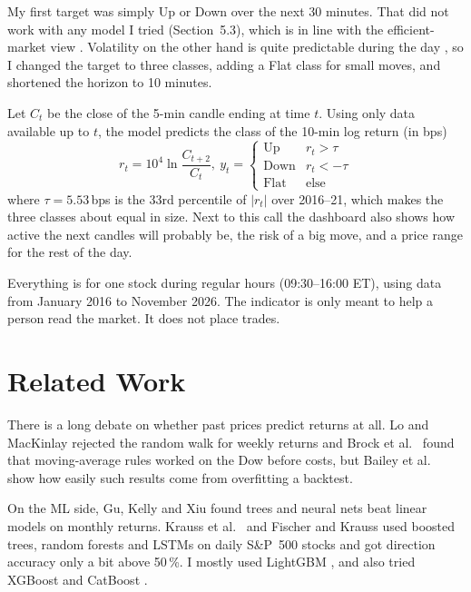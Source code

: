 \documentclass[11pt,a4paper]{article}
\begin{document}
My first target was simply Up or Down over the next 30 minutes. That did not work with any model I tried (Section~5.3),
which is in line with the efficient-market view \cite{fama1970}. Volatility on the other hand is quite predictable
during the day \cite{andersen1997}, so I changed the target to three classes, adding a Flat class for small moves, and
shortened the horizon to 10 minutes.

Let $C_t$ be the close of the 5-min candle ending at time $t$. Using only data available up to $t$, the model
predicts the class of the 10-min log return (in bps)
\begin{equation}
  r_t = 10^4 \ln\frac{C_{t+2}}{C_t},
  \ y_t = \begin{cases} \text{Up} & r_t > \tau \\ \text{Down} & r_t < -\tau \\ \text{Flat} & \text{else} \end{cases}
  \label{eq:label}
\end{equation}
where $\tau = 5.53$\,bps is the 33rd percentile of $|r_t|$ over 2016--21, which makes the three classes about equal
in size. Next to this call the dashboard also shows how active the next candles will probably be, the risk of a big
move, and a price range for the rest of the day.

Everything is for one stock during regular hours (09:30--16:00 ET), using data from January 2016 to November 2026.
The indicator is only meant to help a person read the market. It does not place trades.

\section{Related Work}
There is a long debate on whether past prices predict returns at all. Lo and MacKinlay \cite{lo1988} rejected the
random walk for weekly returns and Brock et al.\ \cite{brock1992} found that moving-average rules worked on the Dow
before costs, but Bailey et al.\ \cite{bailey2014} show how easily such results come from overfitting a backtest.

On the ML side, Gu, Kelly and Xiu \cite{gu2020} found trees and neural nets beat linear models on monthly returns.
Krauss et al.\ \cite{krauss2017} and Fischer and Krauss \cite{fischer2018} used boosted trees, random forests and
LSTMs on daily S\&P~500 stocks and got direction accuracy only a bit above 50\,\%. I mostly used LightGBM
\cite{ke2017}, and also tried XGBoost \cite{chen2016} and CatBoost \cite{prokhorenkova2018}.
\end{document}
